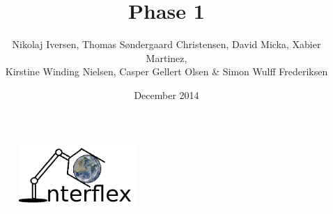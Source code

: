 \begin{titlepage}


\title{Phase 1}
\author{Nikolaj Iversen, Thomas Søndergaard Christensen, David Micka, Xabier Martinez,\\ Kirstine Winding Nielsen, Casper Gellert Olsen \& Simon Wulff Frederiksen}
\date{December 2014}

\begin{figure}[b]
\centering
\includegraphics[width=0.4\textwidth]{graphics/logo}
\end{figure}

\vfill
\end{titlepage}
\maketitle
